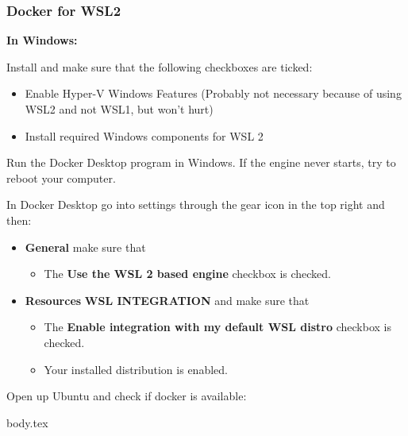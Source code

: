 \subsubsection{Docker for WSL2}

\textbf{In Windows:}


Install and make sure that the following checkboxes are ticked:
\begin{itemize}
    \item Enable Hyper-V Windows Features (Probably not necessary because of using WSL2 and not WSL1, but won't hurt)
    \item Install required Windows components for WSL 2
\end{itemize}

Run the Docker Desktop program in Windows. If the engine never starts, try to reboot your computer.

In Docker Desktop go into settings through the gear icon in the top right and then:
\begin{itemize}
    \item \textbf{General} make sure that
    \begin{itemize}
        \item The \textbf{Use the WSL 2 based engine} checkbox is checked.
    \end{itemize}
    \item \textbf{Resources} \ra \textbf{WSL INTEGRATION} and make sure that
    \begin{itemize}
        \item The \textbf{Enable integration with my default WSL distro} checkbox is checked.
        \item Your installed distribution is enabled.
    \end{itemize}
\end{itemize}

Open up Ubuntu and check if docker is available:


{body.tex}

